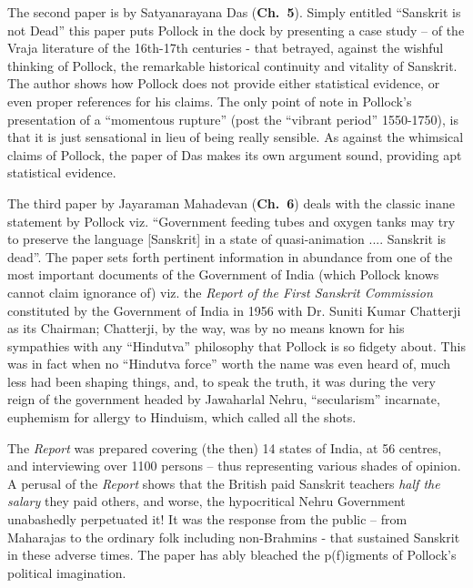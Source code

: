 The second paper is by Satyanarayana Das ({\bf Ch.~5}). Simply entitled “Sanskrit is not Dead” this paper puts Pollock in the dock by presenting a case study – of the Vraja literature of the 16th-17th centuries - that betrayed, against the wishful thinking of Pollock, the remarkable historical continuity and vitality of Sanskrit. The author shows how Pollock does not provide either statistical evidence, or even proper references for his claims. The only point of note in Pollock’s presentation of a “momentous rupture” (post the “vibrant period'' 1550-1750), is that it is just sensational in lieu of being really sensible. As against the whimsical claims of Pollock, the paper of Das makes its own argument sound, providing apt statistical evidence.

The third paper by Jayaraman Mahadevan ({\bf Ch.~6}) deals with the classic inane statement by Pollock viz. “Government feeding tubes and oxygen tanks may try to preserve the language [Sanskrit] in a state of quasi-animation .... Sanskrit is dead”. The paper sets forth pertinent information in abundance from one of the most important documents of the Government of India (which Pollock knows cannot claim ignorance of) viz. the {\sl Report of the First Sanskrit Commission} constituted by the Government of India in 1956 with Dr. Suniti Kumar Chatterji as its Chairman; Chatterji, by the way, was by no means known for his sympathies with any “Hindutva” philosophy that Pollock is so fidgety about. This was in fact when no “Hindutva force” worth the name was even heard of, much less had been shaping things, and, to speak the truth, it was during the very reign of the government headed by Jawaharlal Nehru, “secularism” incarnate, euphemism for allergy to Hinduism, which called all the shots.

The {\sl Report} was prepared covering (the then) 14 states of India, at 56 centres, and interviewing over 1100 persons – thus representing various shades of opinion. A perusal of the {\sl Report} shows that the British paid Sanskrit teachers {\sl half the salary} they paid others, and worse, the hypocritical Nehru Government unabashedly perpetuated it! It was the response from the public – from Maharajas to the ordinary folk including non-Brahmins - that sustained Sanskrit in these adverse times. The paper has ably bleached the p(f)igments of Pollock’s political imagination.

